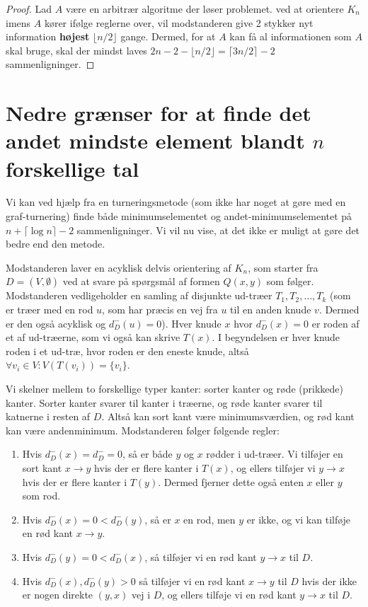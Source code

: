 \begin{proof}
	Lad $A$ være en arbitrær algoritme der løser problemet. ved at orientere $K_{n}$ imens $A$ kører ifølge reglerne over, vil modstanderen give 2 stykker nyt information \textbf{højest} $\lfloor n/2 \rfloor$ gange. Dermed, for at $A$ kan få al informationen som $A$ skal bruge, skal der mindst laves $2n-2-\lfloor n/2 \rfloor = \lceil 3n/2 \rceil -2$ sammenligninger.
\end{proof}

\section{Nedre grænser for at finde det andet mindste element blandt $n$ forskellige tal}%
\label{sec:label}

Vi kan ved hjælp fra en turneringsmetode (som ikke har noget at gøre med en graf-turnering) finde både minimumselementet og andet-minimumselementet på $n + \lceil \log n \rceil - 2$ sammenligninger. Vi vil nu vise, at det ikke er muligt at gøre det bedre end den metode.

Modstanderen laver en acyklisk delvis orientering af $K_{n}$, som starter fra $D = (V, \emptyset)$ ved at svare på spørgsmål af formen $Q(x,y)$ som følger. Modstanderen vedligeholder en samling af disjunkte ud-træer $T_{1}, T_{2}, \ldots, T_{k}$ (som er træer med en rod $u$, som har præcis en vej fra $u$ til en anden knude $v$. Dermed er den også acyklisk og $d_{D}^{-}(u) = 0$). Hver knude $x$ hvor $d_{D}^{-}(x) = 0$ er roden af et af ud-træerne, som vi også kan skrive $T(x)$. I begyndelsen er hver knude roden i et ud-træ, hvor roden er den eneste knude, altså $\forall v_{i} \in V : V(T(v_{i})) = \{v_i\}$.

Vi skelner mellem to forskellige typer kanter: sorter kanter og røde (prikkede) kanter. Sorter kanter svarer til kanter i træerne, og røde kanter svarer til katnerne i resten af $D$. Altså kan sort kant være minimumsværdien, og rød kant kan være andenminimum. Modstanderen følger følgende regler:

\begin{enumerate}
	\item Hvis $d_{D}^{-}(x) = d_{D}^{-} = 0$, så er både $y$ og $x$ rødder i ud-træer. Vi tilføjer en sort kant $x\rightarrow y$ hvis der er flere kanter i $T(x)$, og ellers tilføjer vi $y \rightarrow x$ hvis der er flere kanter i $T(y)$. Dermed fjerner dette også enten $x$ eller $y$ som rod.
	\item Hvis $d_{D}^{-}(x) = 0 < d_{D}^{-}(y)$, så er $x$ en rod, men $y$ er ikke, og vi kan tilføje en rød kant $x \rightarrow y$.
	\item Hvis $d_{D}^{-}(y) = 0 < d_{D}^{-}(x)$, så tilføjer vi en rød kant $y \rightarrow x$ til $D$.
	\item Hvis $d_{D}^{-}(x), d_{D}^{-}(y) > 0$ så tilføjer vi en rød kant $x \rightarrow y$ til $D$ hvis der ikke er nogen direkte $(y,x)$ vej i $D$, og ellers tilføje vi en rød kant $y \rightarrow x$ til $D$.
\end{enumerate}

